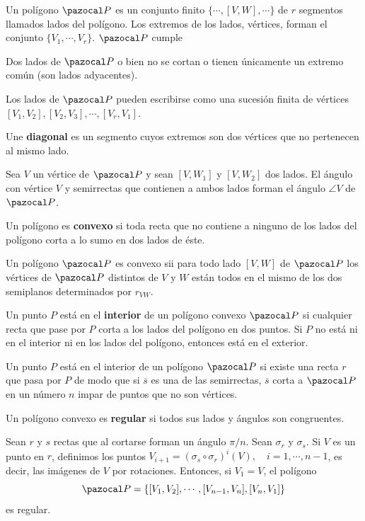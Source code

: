  Un polígono $\PP$ es un conjunto finito
$\{\cdots, [V,W],\cdots \}$ de $r$ segmentos llamados lados del polígono. Los extremos de los lados, vértices, forman el conjunto $\{V_1,\cdots,V_r \}$. $\PP$ cumple
\begin{itemizex}
	\item Dos lados de $\PP$ o bien no se cortan o tienen únicamente un extremo común (son lados adyacentes).
	\item Los lados de $\PP$ pueden escribirse como una sucesión finita de vértices $[V_1,V_2],[V_2,V_3],\cdots,[V_r,V_1]$.
\end{itemizex}

 Une \textbf{diagonal} es un segmento cuyos extremos son dos vértices que no pertenecen al mismo lado.

 Sea $V$ un vértice de $\PP$ y sean $[V,W_1]$ y $[V,W_2]$ dos lados. El ángulo con vértice $V$ y semirrectas que contienen a ambos lados forman el ángulo $\angle V$ de $\PP$.

 Un polígono es \textbf{convexo} si toda recta que no contiene a ninguno de los lados del polígono corta a lo sumo en dos lados de éste.

  Un polígono $\PP$ es convexo sii para todo lado $[V,W]$ de $\PP$ los vértices de $\PP$ distintos de $V$ y $W$ están todos en el mismo de los dos semiplanos determinados por $r_{VW}$.
 
  Un punto $P$ está en el \textbf{interior} de un polígono convexo $\PP$ si cualquier recta que pase por $P$ corta a los lados del polígono en dos puntos. Si $P$ no está ni en el interior ni en los lados del polígono, entonces está en el exterior. 
 
  Un punto $P$ está en el interior de un polígono $\PP$ si existe una recta $r$ que pasa por $P$ de modo que si $\overline{s}$ es una de las semirrectas, $\overline{s}$ corta a $\PP$ en un número $n$ impar de puntos que no son vértices.
 
  Un polígono convexo es \textbf{regular} si todos sus lados y ángulos son congruentes.
 
  Sean $r$ y $s$ rectas que al cortarse forman un ángulo $\pi/n$. Sean $\sigma_r$ y $\sigma_s$. Si $V$ es un punto en $r$, definimos los puntos $V_{i+1} = (\sigma_s \circ \sigma_r)^i(V), \quad i=1,\cdots, n-1$, es decir, las imágenes de $V$ por rotaciones. Entonces, si $V_1 = V$, el polígono
 $$\PP= \{[V_1,V_2],\cdots,[V_{n-1},V_n],[V_n,V_1]  \}$$
 es regular.
 

